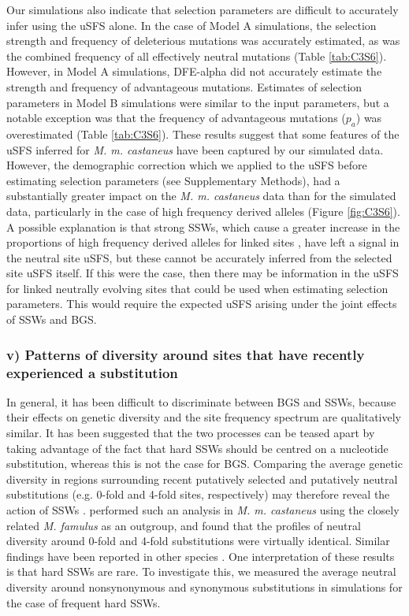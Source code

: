 	Our simulations also indicate that selection parameters are difficult to accurately infer using the uSFS alone. In the case of Model A simulations, the selection strength and frequency of deleterious mutations was accurately estimated, as was the combined frequency of all effectively neutral mutations (Table \ref{tab:C3S6}). However, in Model A simulations, DFE-alpha did not accurately estimate the strength and frequency of advantageous mutations. Estimates of selection parameters in Model B simulations were similar to the input parameters, but a notable exception was that the frequency of advantageous mutations ($p_a$) was overestimated (Table \ref{tab:C3S6}). These results suggest that some features of the uSFS inferred for \textit{M. m. castaneus} have been captured by our simulated data. However, the demographic correction which we applied to the uSFS before estimating selection parameters (see Supplementary Methods), had a substantially greater impact on the \textit{M. m. castaneus} data than for the simulated data, particularly in the case of high frequency derived alleles (Figure \ref{fig:C3S6}). A possible explanation is that strong SSWs, which cause a greater increase in the proportions of high frequency derived alleles for linked sites \citep{RN343}, have left a signal in the neutral site uSFS, but these cannot be accurately inferred from the selected site uSFS itself. If this were the case, then there may be information in the uSFS for linked neutrally evolving sites that could be used when estimating selection parameters. This would require the expected uSFS arising under the joint effects of SSWs and BGS.

\linespread{1}

\linespread{2}


\subsubsection{v) Patterns of diversity around sites that have recently experienced a substitution}

	In general, it has been difficult to discriminate between BGS and SSWs, because their effects on genetic diversity and the site frequency spectrum are qualitatively similar. It has been suggested that the two processes can be teased apart by taking advantage of the fact that hard SSWs should be centred on a nucleotide substitution, whereas this is not the case for BGS. Comparing the average genetic diversity in regions surrounding recent putatively selected and putatively neutral substitutions (e.g. 0-fold and 4-fold sites, respectively) may therefore reveal the action of SSWs \citep{RN162, RN167}. \cite{RN122} performed such an analysis in \textit{M. m. castaneus} using the closely related \textit{M. famulus} as an outgroup, and found that the profiles of neutral diversity around 0-fold and 4-fold substitutions were virtually identical. Similar findings have been reported in other species \citep{RN162,RN230}. One interpretation of these results is that hard SSWs are rare. To investigate this, we measured the average neutral diversity around nonsynonymous and synonymous substitutions in simulations for the case of frequent hard SSWs.


